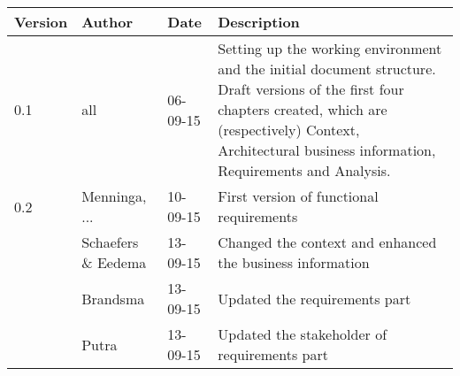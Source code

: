 \begin{longtable}{L{} L{} L{} L{}}
	\textbf{Version} & \textbf{Author}       & \textbf{Date} & \textbf{Description}                                                                                                                                                                                                       \\
			
	\toprule
	0.1              & all                   & 06-09-15      & Setting up the working environment and the initial document structure. Draft versions of the first four chapters created, which are (respectively) Context, Architectural business information, Requirements and Analysis. \\
	\midrule
			
	0.2              & Menninga, ...         & 10-09-15      & First version of functional requirements                                                                                                                                                                                   \\
			    
	                 & Schaefers \& Eedema   & 13-09-15      & Changed the context and enhanced the business information                                                                                                                                                                  \\
			
	                 & Brandsma              & 13-09-15      & Updated the requirements part                                                                                                                                                                                              \\
	                 & Putra                 & 13-09-15      & Updated the stakeholder of requirements part                                                                                                                                                                               \\
	\midrule
			

\end{longtable}

